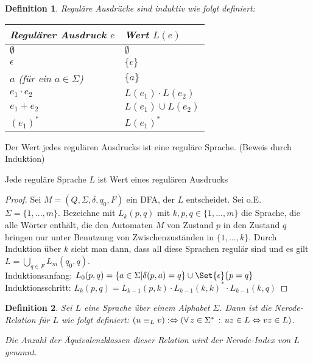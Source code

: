 \documentclass{cheat-sheet}
\newtheorem*{definition}{Definition}
\begin{document}
\begin{definition}
\emph{Reguläre Ausdrücke} sind induktiv wie folgt definiert:

\begin{center}
\begin{tabular}{ l | l }
  Regulärer Ausdruck $e$ & Wert $L(e)$ \\
  \hline
  $\emptyset$ & $\emptyset$ \\
  $\epsilon$ & $\{\epsilon\}$ \\
  $a$ (für ein $a \in \Sigma$) & $\{ a \}$ \\
  $e_{1} \cdot e_{2}$ & $L(e_{1}) \cdot L(e_{2})$ \\
  $e_{1} + e_{2}$ & $L(e_{1}) \cup L(e_{2})$ \\
  $(e_{1})^{*}$ & $L(e_{1})^{*}$ \\
\end{tabular}
\end{center}

\end{definition}

\begin{satz}
Der Wert jedes regulären Ausdrucks ist eine reguläre Sprache. (Beweis durch Induktion)
\end{satz}

\begin{satz}
Jede reguläre Sprache $L$ ist Wert eines regulären Ausdrucks
\end{satz}

\begin{proof}
Sei $M = (Q, \Sigma, \delta, q_{0}, F)$ ein DFA, der $L$ entscheidet. Sei o.E. $\Sigma = \{ 1, ..., m \}$. Bezeichne mit $L_{k}(p, q)$ mit $k, p, q \in \{1, ..., m\}$ die Sprache, die alle Wörter enthält, die den Automaten $M$ von Zustand $p$ in den Zustand $q$ bringen nur unter Benutzung von Zwischenzuständen in $\{ 1, ..., k \}$. Durch Induktion über $k$ sieht man dann, dass all diese Sprachen regulär sind und es gilt $L = \bigcup_{q \in F} L_{m}(q_{0}, q)$.\\
Induktionsanfang: $L_{0}(p, q) = \{ a \in \Sigma | \delta(p, a) = q \} \cup \Set{\epsilon}{p = q}$ \\
Induktionsschritt: $L_{k}(p, q) = L_{k-1}(p, k) \cdot L_{k-1}(k, k)^{*} \cdot L_{k-1}(k, q)$
\end{proof}

\begin{definition}
Sei $L$ eine Sprache über einem Alphabet $\Sigma$. Dann ist die \emph{Nerode-Relation} für $L$ wie folgt definiert: $(u \equiv_{L} v) :\Leftrightarrow (\forall \, {z \in \Sigma^{*}} \,:\, uz \in L \Leftrightarrow vz \in L)$.

Die Anzahl der Äquivalenzklassen dieser Relation wird der \emph{Nerode-Index} von $L$ genannt.
\end{definition}
\end{document}
